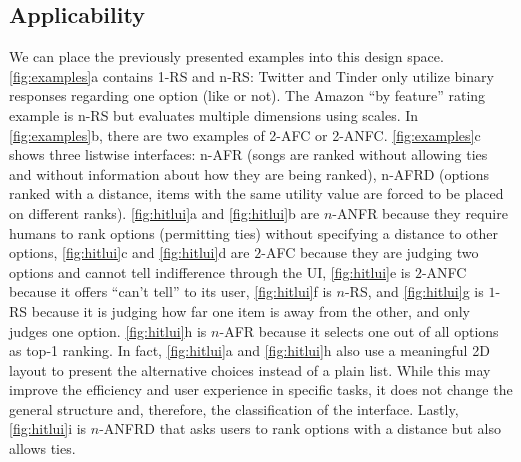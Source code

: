 \documentclass[acmsmall,screen,nonacm]{acmart}
\begin{document}
\subsection{Applicability}
\label{sec:space1}
We can place the previously presented examples into this design space. \autoref{fig:examples}a contains 1-RS and n-RS: Twitter and Tinder only utilize binary responses regarding one option (like or not). The Amazon ``by feature'' rating example is n-RS but evaluates multiple dimensions using scales.
%
In \autoref{fig:examples}b, there are two examples of 2-AFC or 2-ANFC. 
% 
\autoref{fig:examples}c shows three listwise interfaces: n-AFR (songs are ranked without allowing ties and without information about how they are being ranked), n-AFRD (options ranked with a distance, items with the same utility value are forced to be placed on different ranks).
% 
\autoref{fig:hitlui}a and \autoref{fig:hitlui}b are $n$-ANFR because they require humans to rank options (permitting ties) without specifying a distance to other options,
%
\autoref{fig:hitlui}c and \autoref{fig:hitlui}d are $2$-AFC because they are judging two options and cannot tell indifference through the UI,
%
\autoref{fig:hitlui}e is $2$-ANFC because it offers ``can't tell'' to its user,
%
\autoref{fig:hitlui}f is $n$-RS, and \autoref{fig:hitlui}g is $1$-RS because it is judging how far one item is away from the other, and only judges one option.
%
\autoref{fig:hitlui}h is $n$-AFR because it selects one out of all options as top-1 ranking.
%
In fact, \autoref{fig:hitlui}a and \autoref{fig:hitlui}h also use a meaningful 2D layout to present the alternative choices instead of a plain list. While this may improve the efficiency and user experience in specific tasks, it does not change the general structure and, therefore, the classification of the interface.
%
Lastly, \autoref{fig:hitlui}i is $n$-ANFRD that asks users to rank options with a distance but also allows ties.
\end{document}
